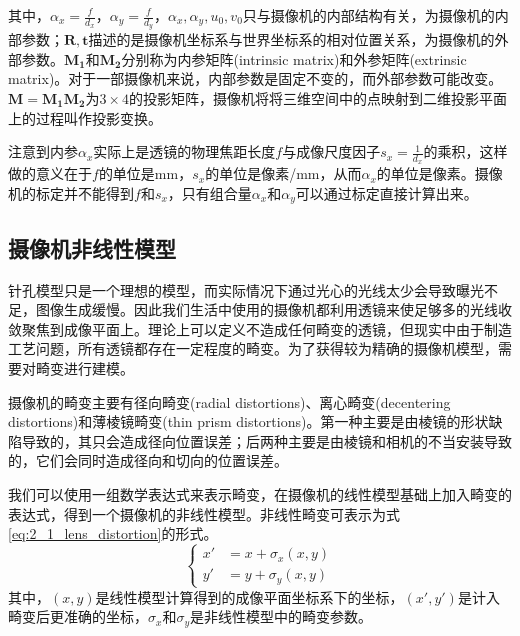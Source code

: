 其中，$\alpha_x=\frac{f}{d_x}$，$\alpha_y=\frac{f}{d_y}$，$\alpha_x, \alpha_y, u_0, v_0$只与摄像机的内部结构有关，为摄像机的内部参数；$\mathbf{R}, \mathbf{t}$描述的是摄像机坐标系与世界坐标系的相对位置关系，为摄像机的外部参数。$\mathbf{M_1}$和$\mathbf{M_2}$分别称为内参矩阵(intrinsic matrix)和外参矩阵(extrinsic matrix)。对于一部摄像机来说，内部参数是固定不变的，而外部参数可能改变。$\mathbf{M}=\mathbf{M_1 M_2}$为$3\times 4$的投影矩阵，摄像机将将三维空间中的点映射到二维投影平面上的过程叫作投影变换。

注意到内参$\alpha_x$实际上是透镜的物理焦距长度$f$与成像尺度因子$s_x=\frac{1}{d_x}$的乘积，这样做的意义在于$f$的单位是mm，$s_x$的单位是像素/mm，从而$\alpha_x$的单位是像素。摄像机的标定并不能得到$f$和$s_x$，只有组合量$\alpha_x$和$\alpha_y$可以通过标定直接计算出来。

\subsection{摄像机非线性模型}
针孔模型只是一个理想的模型，而实际情况下通过光心的光线太少会导致曝光不足，图像生成缓慢。因此我们生活中使用的摄像机都利用透镜来使足够多的光线收敛聚焦到成像平面上\cite{GaryBradski2009学习}。理论上可以定义不造成任何畸变的透镜，但现实中由于制造工艺问题，所有透镜都存在一定程度的畸变。为了获得较为精确的摄像机模型，需要对畸变进行建模。

摄像机的畸变主要有径向畸变(radial distortions)\cite{hartley2003multiple}、离心畸变(decentering distortions)\cite{ricolfe2010lens}和薄棱镜畸变(thin prism distortions)\cite{weng1992camera}。第一种主要是由棱镜的形状缺陷导致的，其只会造成径向位置误差；后两种主要是由棱镜和相机的不当安装导致的，它们会同时造成径向和切向的位置误差\cite{weng1992camera}。

我们可以使用一组数学表达式来表示畸变，在摄像机的线性模型基础上加入畸变的表达式，得到一个摄像机的非线性模型。非线性畸变可表示为式\ref{eq:2_1_lens_distortion}的形式。
%
\begin{equation}\label{eq:2_1_lens_distortion}
\left\{
\begin{aligned}
x' &= x + \sigma_x (x,y)  \\
y' &= y + \sigma_y(x,y)
\end{aligned}
\right.
\end{equation}
其中，$(x,y)$是线性模型计算得到的成像平面坐标系下的坐标，$(x',y')$是计入畸变后更准确的坐标，$\sigma_x$和$\sigma_y$是非线性模型中的畸变参数。

